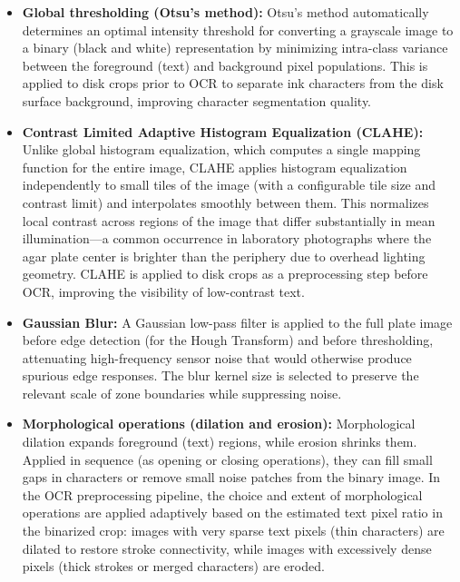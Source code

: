 \begin{itemize}
  \item \textbf{Global thresholding (Otsu's method):} Otsu's method automatically determines
        an optimal intensity threshold for converting a grayscale image to a binary (black and
        white) representation by minimizing intra-class variance between the foreground (text)
        and background pixel populations. This is applied to disk crops prior to OCR to separate
        ink characters from the disk surface background, improving character segmentation quality.

  \item \textbf{Contrast Limited Adaptive Histogram Equalization (CLAHE):} Unlike global
        histogram equalization, which computes a single mapping function for the entire image,
        CLAHE applies histogram equalization independently to small tiles of the image (with a
        configurable tile size and contrast limit) and interpolates smoothly between them.
        This normalizes local contrast across regions of the image that differ substantially
        in mean illumination---a common occurrence in laboratory photographs where the agar plate
        center is brighter than the periphery due to overhead lighting geometry. CLAHE is applied
        to disk crops as a preprocessing step before OCR, improving the visibility of low-contrast
        text.

  \item \textbf{Gaussian Blur:} A Gaussian low-pass filter is applied to the full plate image
        before edge detection (for the Hough Transform) and before thresholding, attenuating
        high-frequency sensor noise that would otherwise produce spurious edge responses.
        The blur kernel size is selected to preserve the relevant scale of zone boundaries
        while suppressing noise.

  \item \textbf{Morphological operations (dilation and erosion):} Morphological dilation
        expands foreground (text) regions, while erosion shrinks them. Applied in sequence
        (as opening or closing operations), they can fill small gaps in characters or remove
        small noise patches from the binary image. In the OCR preprocessing pipeline,
        the choice and extent of morphological operations are applied adaptively based on the
        estimated text pixel ratio in the binarized crop: images with very sparse text pixels
        (thin characters) are dilated to restore stroke connectivity, while images with
        excessively dense pixels (thick strokes or merged characters) are eroded.


\end{itemize}
